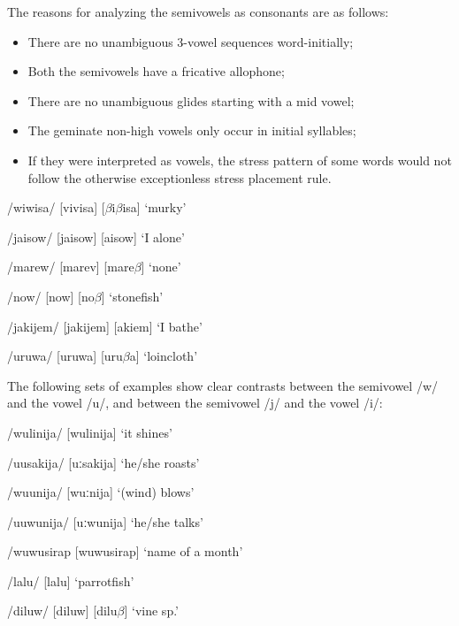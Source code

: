 The reasons for analyzing the semivowels as consonants are as follows:


\begin{itemize}
\item There are no unambiguous 3-vowel sequences word-initially; 

\item Both the semivowels have a fricative allophone;

\item There are no unambiguous glides starting with a mid vowel; 

\item The geminate non-high vowels only occur in initial syllables;

\item If they were interpreted as vowels, the stress pattern of some words would not follow the otherwise exceptionless stress placement rule.


\end{itemize}
/wiwisa/  [vi{{\textprimstress}visa}] {\Tilde} [$\beta $i{{\textprimstress}$\beta $isa}]  `murky'

/jaisow/  [{{\textprimstress}jaisow}] {\Tilde} [{{\textprimstress}}{\textyogh}aisow]  `I alone'

/marew/  [ma{{\textprimstress}rev}] {\Tilde} [ma{{\textprimstress}}re$\beta $]  `none'

/now/  [now] {\Tilde} [no$\beta $]  `stonefish'

/jakijem/  [ja{{\textprimstress}kijem}] {\Tilde} [{\textyogh}a{{\textprimstress}}ki{\textyogh}em]  `I bathe'

/uruwa/  [u{{\textprimstress}ruwa}] {\Tilde} [u{{\textprimstress}}ru$\beta $a]  `loincloth'

The following sets of examples show clear contrasts between the semivowel /w/ and the vowel /u/, and between the semivowel /j/ and the vowel /i/:

/wulinija/  [wu{{\textprimstress}linija}]  `it shines'

/uusakija/  [{{\textprimstress}uːsakija}]  `he/she roasts'

/wuunija/  [{{\textprimstress}wuːnija}]  `(wind) blows'

/uuwunija/  [{{\textprimstress}uːwunija}]  `he/she talks'

/wuwusirap  [wu{{\textprimstress}wusirap}]  `name of a month'

/lalu/  [la{{\textprimstress}lu}]  `parrotfish'

/diluw/  [di{{\textprimstress}luw}] {\Tilde} [di{{\textprimstress}lu$\beta $}]  `vine sp.'

